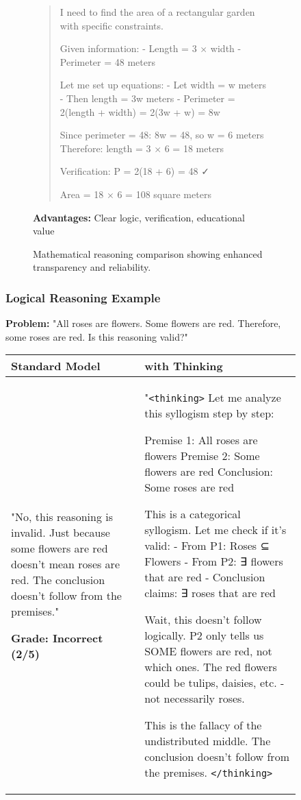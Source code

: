 \begin{table}[H]
\begin{figure}[H]
\begin{figure}[H]
\begin{minipage}{0.48\textwidth}
\begin{quote}
I need to find the area of a rectangular garden with specific constraints.

Given information:
- Length = 3 × width
- Perimeter = 48 meters

Let me set up equations:
- Let width = w meters
- Then length = 3w meters
- Perimeter = 2(length + width) = 2(3w + w) = 8w

Since perimeter = 48: 8w = 48, so w = 6 meters
Therefore: length = 3 × 6 = 18 meters

Verification: P = 2(18 + 6) = 48 ✓

Area = 18 × 6 = 108 square meters
\end{quote}
\textbf{Advantages:} Clear logic, verification, educational value
\end{minipage}
\caption{Mathematical reasoning comparison showing enhanced transparency and reliability.}
\label{fig:math-example}
\end{figure}

\subsubsection{Logical Reasoning Example}

\textbf{Problem:} "All roses are flowers. Some flowers are red. Therefore, some roses are red. Is this reasoning valid?"

\begin{table}[H]
\centering
\begin{tabular}{p{}|p{}}
\toprule
\textbf{Standard Model} & \textbf{\supra{} with Thinking} \\
\midrule
\footnotesize
"No, this reasoning is invalid. Just because some flowers are red doesn't mean roses are red. The conclusion doesn't follow from the premises."

\textbf{Grade: Incorrect (2/5)}
&
\footnotesize
"\texttt{<thinking>}
Let me analyze this syllogism step by step:

Premise 1: All roses are flowers
Premise 2: Some flowers are red
Conclusion: Some roses are red

This is a categorical syllogism. Let me check if it's valid:
- From P1: Roses ⊆ Flowers
- From P2: ∃ flowers that are red
- Conclusion claims: ∃ roses that are red

Wait, this doesn't follow logically. P2 only tells us SOME flowers are red, not which ones. The red flowers could be tulips, daisies, etc. - not necessarily roses.

This is the fallacy of the undistributed middle. The conclusion doesn't follow from the premises.
\texttt{</thinking>}


\end{tabular}
\end{table}
\end{figure}
\end{table}
